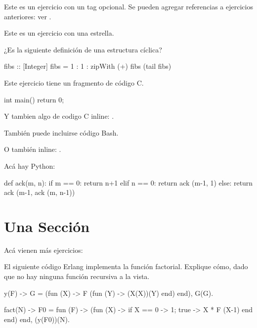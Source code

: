 \documentclass[debug,practica]{lcc}
\begin{document}
\begin{ejercicio}[(difícil)]
    Este es un ejercicio con un tag opcional.
    Se pueden agregar referencias a ejercicios anteriores: ver .
\end{ejercicio}

\begin{ejercicio}[\unskip*]
    Este es un ejercicio con una estrella.
\end{ejercicio}

\begin{ejercicio}
    ¿Es la siguiente definición de  una estructura cíclica?
    \begin{Hask}
fibs :: [Integer]
fibs = 1 : 1 : zipWith (+) fibs (tail fibs)
    \end{Hask}
\end{ejercicio}

\begin{ejercicio}
    Este ejercicio tiene un fragmento de código C.
    \begin{C}
int main()
{
    return 0;
}
    \end{C}
    Y tambien algo de codigo C inline: .
\end{ejercicio}

\begin{ejercicio}
    También puede incluirse código Bash.
    O también inline: \bash{:()\{ :|:& \};:}.
\end{ejercicio}

\begin{ejercicio}
    Acá hay Python:
    \begin{Py}
def ack(m, n):
    if m == 0:
        return n+1
    elif n == 0:
        return ack (m-1, 1)
    else:
        return ack (m-1, ack (m, n-1))
    \end{Py}
\end{ejercicio}

\section{Una Sección}

Acá vienen más ejercicios:

\begin{ejercicio}
    El siguiente código Erlang implementa la función factorial.
    Explique cómo, dado que no hay ninguna función recursiva a la vista.
    \begin{Erl}
y(F) ->
	G = (fun (X) -> F (fun (Y) -> (X(X))(Y) end) end),
	G(G).

fact(N) ->
	F0 = fun (F) -> (fun (X) -> if X == 0 -> 1; true -> X * F (X-1) end end) end,
	(y(F0))(N).
    \end{Erl}
\end{ejercicio}
\end{document}
